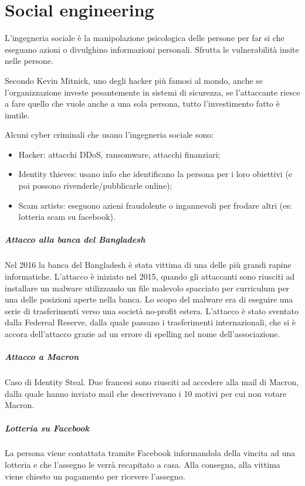 \chapter{Social engineering} 
L'ingegneria sociale è la manipolazione psicologica delle persone per far si che eseguano azioni o divulghino informazioni personali. Sfrutta le vulnerabilità insite nelle persone.

Secondo Kevin Mitnick, uno degli hacker più famosi al mondo, anche se l'organizzazione investe pesantemente in sistemi di sicurezza, se l'attaccante riesce a fare quello che vuole anche a una sola persona, tutto l'investimento fatto è inutile.

Alcuni cyber criminali che usano l'ingegneria sociale sono:
\begin{itemize}
    \item Hacker: attacchi DDoS, ransomware, attacchi finanziari;
    \item Identity thieves: usano info che identificano la persona per i loro obiettivi (e poi possono rivenderle/pubblicarle online);
    \item Scam artists: eseguono azieni fraudolente o ingannevoli per frodare altri (es: lotteria scam su facebook).
\end{itemize}

\paragraph{Attacco alla banca del Bangladesh} Nel 2016 la banca del Bangladesh è stata vittima di una delle più grandi rapine informatiche. L'attacco è iniziato nel 2015, quando gli attaccanti sono riusciti ad installare un malware utilizzando un file malevolo spacciato per curriculum per una delle posizioni aperte nella banca. Lo scopo del malware era di eseguire una serie di trasferimenti verso una società no-profit estera. L'attacco è stato sventato dalla Federeal Reserve, dalla quale passano i trasferimenti internazionali, che si è accora dell'attacco grazie ad un errore di spelling nel nome dell'associazione.

\paragraph{Attacco a Macron} Caso di Identity Steal. Due francesi sono riusciti ad accedere alla mail di Macron, dalla quale hanno inviato mail che descrivevano i 10 motivi per cui non votare Macron.

\paragraph{Lotteria su Facebook} La persona viene contattata tramite Facebook informandola della vincita ad una lotteria e che l'assegno le verrà recapitato a casa. Alla consegna, alla vittima viene chiesto un pagamento per ricevere l'assegno.

